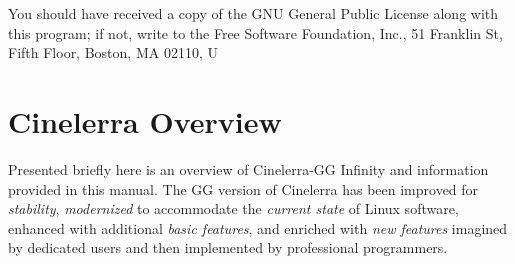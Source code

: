 You should have received a copy of the GNU General Public License along with this program;
if not, write to the Free Software Foundation, Inc., 51 Franklin St, Fifth Floor, Boston, MA 02110, U

\section{Cinelerra Overview}%
\label{sec:cinelerra_overview}

Presented briefly here is an overview of Cinelerra-GG Infinity and information provided in this manual. 
The GG version of Cinelerra has been improved for \emph{stability}, \emph{modernized} to accommodate the
\emph{current state} of Linux software, enhanced with additional \emph{basic features}, and enriched with \emph{new features} imagined by dedicated users and then implemented by professional programmers.

